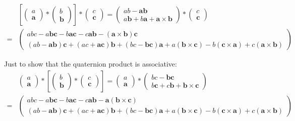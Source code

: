 \documentclass[11pt]{article}
\newcommand{\vvv}[1]{\ensuremath{\begin{pmatrix}#1\end{pmatrix}}}
\begin{document}
\begin{equation}
    \begin{aligned}
        &[\vvv{a \\ \mathbf{a}} * \vvv{b \\ \mathbf{b}}] * \vvv{c \\ \mathbf{c}} = 
        \vvv{ab - \mathbf{a} \mathbf{b} \\ a\mathbf{b} + b\mathbf{a} + \mathbf{a} \times \mathbf{b}} *  
        \vvv{c \\ \mathbf{c}} \\ =
        &\vvv{
            abc - a\mathbf{b}\mathbf{c} - b\mathbf{a}\mathbf{c} - 
            c\mathbf{a}\mathbf{b} - (\mathbf{a} \times \mathbf{b})\mathbf{c} \\
            (ab - \mathbf{a}\mathbf{b})\mathbf{c} +
            (ac + \mathbf{a}\mathbf{c})\mathbf{b} +
            (bc - \mathbf{b}\mathbf{c})\mathbf{a} +
            a(\mathbf{b} \times \mathbf{c}) -
            b(\mathbf{c} \times \mathbf{a}) +
            c(\mathbf{a} \times \mathbf{b})
        }
    \end{aligned}
\end{equation}

Just to show that the quaternion product is associative:
\begin{equation}
    \begin{aligned}
        &\vvv{a \\ \mathbf{a}} * [\vvv{b \\ \mathbf{b}} * \vvv{c \\ \mathbf{c}}]
        = \vvv{a \\ \mathbf{a}} *
        \vvv{bc - \mathbf{b} \mathbf{c} \\ b\mathbf{c} + c\mathbf{b} + \mathbf{b} \times \mathbf{c}} \\
        = &\vvv{
            abc - a\mathbf{b}\mathbf{c} - b\mathbf{a}\mathbf{c} - 
            c\mathbf{a}\mathbf{b} - \mathbf{a}(\mathbf{b} \times \mathbf{c}) \\
            (ab - \mathbf{a}\mathbf{b})\mathbf{c} +
            (ac + \mathbf{a}\mathbf{c})\mathbf{b} +
            (bc - \mathbf{b}\mathbf{c})\mathbf{a} +
            a(\mathbf{b} \times \mathbf{c}) -
            b(\mathbf{c} \times \mathbf{a}) +
            c(\mathbf{a} \times \mathbf{b})
        }
    \end{aligned}
\end{equation}
\end{document}
